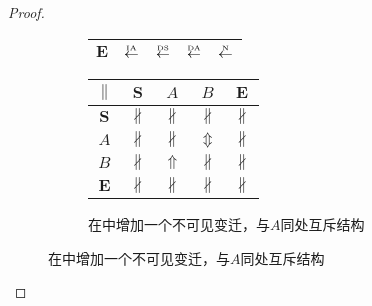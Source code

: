 \begin{proof}
\begin{figure}[htbp]
\begin{subfigure}{1\textwidth}
\begin{minipage}[b]{0.3\textwidth}
\begin{tabular}{|c|c|c|c|c|}
        $\bm{E}$ & $\overset{\text{\tiny{IA}}}{\leftarrow}$ & $\overset{\text{\tiny{DS}}}{\leftarrow}$ & $\overset{\text{\tiny{DA}}}{\leftarrow}$ & $\overset{\text{\tiny{N}}}{\leftarrow}$\\ \hline
      \end{tabular}
    \end{minipage}
    \begin{minipage}[b]{0.3\textwidth}
      \vspace{1em}
      \centering
      \begin{tabular}{|c|c|c|c|c|} \hline
        $\parallel$ & $\bm{S}$ & $A$ & $B$ & $\bm{E}$\\ \hline
        $\bm{S}$ & $\nparallel$ & $\nparallel$ & $\nparallel$ & $\nparallel$\\ \hline
        $A$ & $\nparallel$ & $\nparallel$ & $\Updownarrow$ & $\nparallel$\\ \hline
        $B$ & $\nparallel$ & $\Uparrow$ & $\nparallel$ & $\nparallel$\\ \hline
        $\bm{E}$ & $\nparallel$ & $\nparallel$ & $\nparallel$ & $\nparallel$\\ \hline
      \end{tabular}
    \end{minipage}
    \caption{在中增加一个不可见变迁，与$A$同处互斥结构}
    \label{fig:uniqueness_3_g}
  \end{subfigure}


\end{figure}
\end{proof}
